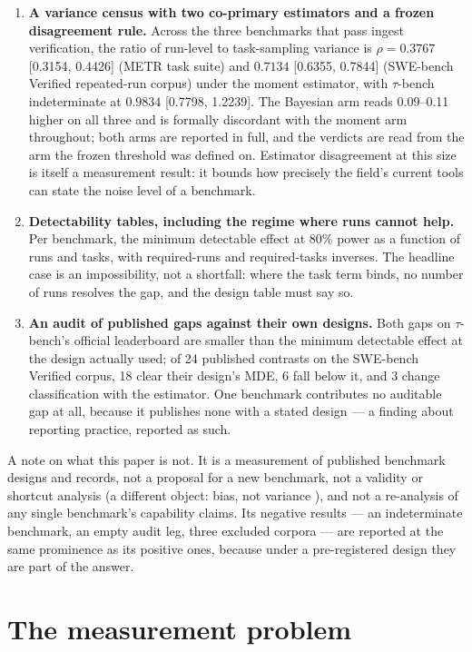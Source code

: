\documentclass[11pt]{article}
\begin{document}
\begin{enumerate}
\item \textbf{A variance census with two co-primary estimators and a
frozen disagreement rule.} Across the three benchmarks that pass
ingest verification, the ratio of run-level to task-sampling variance
is $\rho = 0.3767$ [0.3154, 0.4426] (METR task suite) and $0.7134$
[0.6355, 0.7844] (SWE-bench Verified repeated-run corpus) under the
moment estimator, with $\tau$-bench indeterminate at $0.9834$
[0.7798, 1.2239]. The Bayesian arm reads 0.09--0.11 higher on all
three and is formally discordant with the moment arm throughout; both
arms are reported in full, and the verdicts are read from the arm the
frozen threshold was defined on. Estimator disagreement at this size
is itself a measurement result: it bounds how precisely the field's
current tools can state the noise level of a benchmark.
\item \textbf{Detectability tables, including the regime where runs
cannot help.} Per benchmark, the minimum detectable effect at 80\%
power as a function of runs and tasks, with required-runs and
required-tasks inverses. The headline case is an impossibility, not a
shortfall: where the task term binds, no number of runs resolves the
gap, and the design table must say so.
\item \textbf{An audit of published gaps against their own designs.}
Both gaps on $\tau$-bench's official leaderboard are smaller than the
minimum detectable effect at the design actually used; of 24 published
contrasts on the SWE-bench Verified corpus, 18 clear their design's
MDE, 6 fall below it, and 3 change classification with the estimator.
One benchmark contributes no auditable gap at all, because it
publishes none with a stated design --- a finding about reporting
practice, reported as such.
\end{enumerate}

A note on what this paper is not. It is a measurement of published
benchmark designs and records, not a proposal for a new benchmark, not
a validity or shortcut analysis (a different object: bias, not
variance \cite{zhu2025,wang2026}), and not a re-analysis of any single
benchmark's capability claims. Its negative results --- an
indeterminate benchmark, an empty audit leg, three excluded corpora
--- are reported at the same prominence as its positive ones, because
under a pre-registered design they are part of the answer.

\section{The measurement problem}
\end{document}
